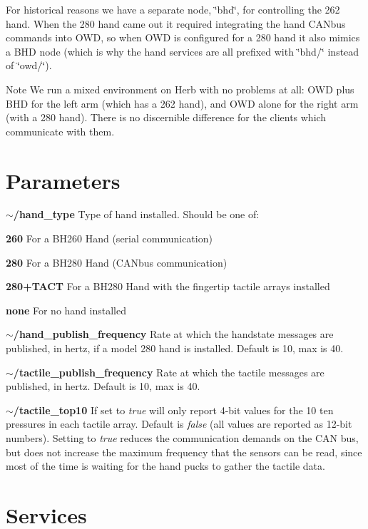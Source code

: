 For historical reasons we have a separate node, \char`\"{}bhd\char`\"{}, for controlling the 262 hand. When the 280 hand came out it required integrating the hand C\-A\-Nbus commands into O\-W\-D, so when O\-W\-D is configured for a 280 hand it also mimics a B\-H\-D node (which is why the hand services are all prefixed with \char`\"{}bhd/\char`\"{} instead of \char`\"{}owd/\char`\"{}).

\begin{DoxyNote}{Note}
We run a mixed environment on Herb with no problems at all\-: O\-W\-D plus B\-H\-D for the left arm (which has a 262 hand), and O\-W\-D alone for the right arm (with a 280 hand). There is no discernible difference for the clients which communicate with them.
\end{DoxyNote}
\hypertarget{bhand_parameters}{}\section{Parameters}\label{bhand_parameters}

\begin{DoxyItemize}
\item {\bfseries $\sim$/hand\-\_\-type} Type of hand installed. Should be one of\-:
\begin{DoxyItemize}
\item {\bfseries 260} For a B\-H260 Hand (serial communication)
\item {\bfseries 280} For a B\-H280 Hand (C\-A\-Nbus communication)
\item {\bfseries 280+\-T\-A\-C\-T} For a B\-H280 Hand with the fingertip tactile arrays installed
\item {\bfseries none} For no hand installed
\end{DoxyItemize}
\item {\bfseries $\sim$/hand\-\_\-publish\-\_\-frequency} Rate at which the handstate messages are published, in hertz, if a model 280 hand is installed. Default is 10, max is 40.
\item {\bfseries $\sim$/tactile\-\_\-publish\-\_\-frequency} Rate at which the tactile messages are published, in hertz. Default is 10, max is 40.
\item {\bfseries $\sim$/tactile\-\_\-top10} If set to {\itshape true} will only report 4-\/bit values for the 10 ten pressures in each tactile array. Default is {\itshape false} (all values are reported as 12-\/bit numbers). Setting to {\itshape true} reduces the communication demands on the C\-A\-N bus, but does not increase the maximum frequency that the sensors can be read, since most of the time is waiting for the hand pucks to gather the tactile data.
\end{DoxyItemize}\hypertarget{bhand_services}{}\section{Services}\label{bhand_services}

